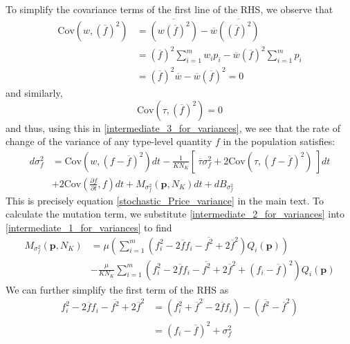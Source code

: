 To simplify the covariance terms of the first line of the RHS, we observe that
\begin{align*}
\textrm{Cov}\left(w, {\left(\overline{f}\right)}^2\right) &= \overline{\left(w{\left(\overline{f}\right)}^2\right)} - \overline{w}\overline{\left({\left(\overline{f}\right)}^2\right)}\\
&= {\left(\overline{f}\right)}^2\sum\limits_{i=1}^{m}w_ip_i - \overline{w}{\left(\overline{f}\right)}^2\sum\limits_{i=1}^{m}p_i\\
&= {\left(\overline{f}\right)}^2\overline{w} - \overline{w}{\left(\overline{f}\right)}^2 = 0
\end{align*}
and similarly,
\begin{equation*}
\textrm{Cov}\left(\tau, {\left(\overline{f}\right)}^2\right) = 0
\end{equation*}
and thus, using this in \eqref{intermediate_3_for_variances},  we see that the rate of change of the variance of any type-level quantity $f$ in the population satisfies:
\begin{equation}
\label{app_stochastic_Price_variance}
\begin{aligned}
d\sigma^2_{f} &= \textrm{Cov}\left(w,(f - \overline{f})^2\right)dt - \frac{1}{KN_K}\left[ \ \overline{\tau}\sigma^2_{f} +  2\textrm{Cov}\left(\tau,(f - \overline{f})^2\right) \ \right]dt\\[12pt]
& + 2\textrm{Cov}\left(\frac{\partial f}{\partial t},f\right)dt + M_{\sigma^2_f}(\mathbf{p},N_K)dt + dB_{\sigma^2_{f}}
\end{aligned}
\end{equation}
This is precisely equation \eqref{stochastic_Price_variance} in the main text. To calculate the mutation term, we substitute \eqref{intermediate_2_for_variances} into \eqref{intermediate_1_for_variances} to find
\begin{equation}
\begin{aligned}
M_{\sigma^2_f}(\mathbf{p},N_K) &= \mu\left(\sum\limits_{i=1}^{m}\left(f^2_i - 2\overline{f}f_i -\overline{f^2}+2\overline{f}^2\right)Q_i(\mathbf{p})\right)\\
&- \frac{\mu}{KN_K}\sum\limits_{i=1}^{m}\left(f^2_i - 2\overline{f}f_i -\overline{f^2}+2\overline{f}^2 + (f_i - \overline{f})^2\right)Q_i(\mathbf{p}) 
\end{aligned}
\end{equation}
We can further simplify the first term of the RHS as
\begin{align*}
f^2_i - 2\overline{f}f_i -\overline{f^2}+2\overline{f}^2 &= (f^2_i +\overline{f}^2 - 2\overline{f}f_i) - (\overline{f^2} - \overline{f}^2)\\
&= (f_i - \overline{f})^2 + \sigma^2_f
\end{align*}
